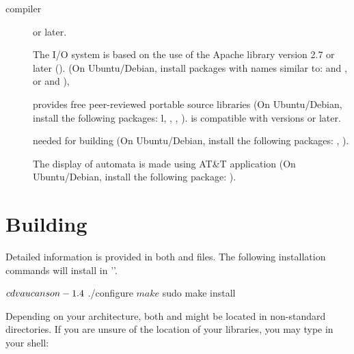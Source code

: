 \begin{description}
\item[\Cpp compiler]  or later.

\item[\XML] The \XML I/O system is based on the use of the Apache 
  \Cpp library version 2.7 or later (). (On
  Ubuntu/Debian, install packages with names similar to:  and ,
  or  and ),
%

\item[]  provides free peer-reviewed
portable \Cpp source
  libraries (On Ubuntu/Debian, install the following packages:
  l, , ,
  ).
  \vcsn is compatible with  versions  or later.
%

\item[] needed for building \tafkit  (On Ubuntu/Debian, install
  the following packages: , ).
%

\item[] The display of automata is made using AT\&T 
  application (On Ubuntu/Debian, install the following package: ).
%

\end{description}

\section{Building \vcsn}
\label{sec:bui-ld}%


Detailed information is provided in both  and 
files. The following installation commands will install \vcsn in
''.

\begin{shell}
$ cd vaucanson-1.4
$ ./configure
$ make
$ sudo make install
\end{shell}%


Depending on your architecture, both  and  might be located
in non-standard directories. If you are unsure of the location of your
libraries, you may type in your shell:

%


